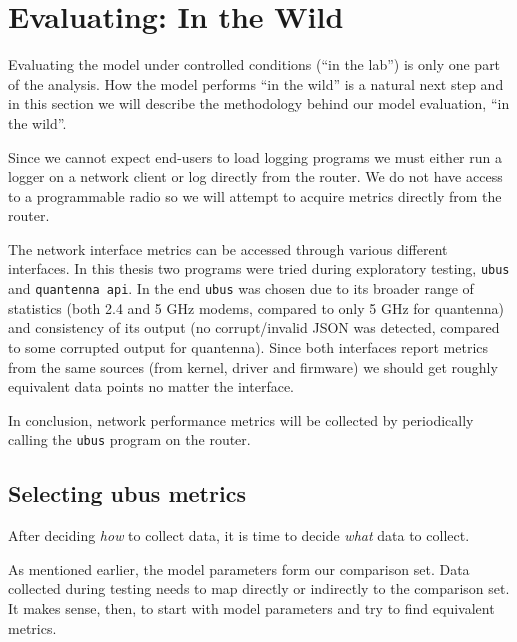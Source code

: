 \section{Evaluating: In the Wild}

Evaluating the model under controlled conditions (``in the lab'') is only one
part of the analysis. How the model performs ``in the wild'' is a natural next
step and in this section we will describe the methodology behind our model
evaluation, ``in the wild''.

Since we cannot expect end-users to load logging programs we must either run a
logger on a network client or log directly from the router. We do not have
access to a programmable radio so we will attempt to acquire metrics directly
from the router.

The network interface metrics can be accessed through various different
interfaces. In this thesis two programs were tried during exploratory testing,
\texttt{ubus} and \texttt{quantenna api}. In the end \texttt{ubus} was chosen
due to its broader range of statistics (both 2.4 and 5 GHz modems, compared to
only 5 GHz for quantenna) and consistency of its output (no corrupt/invalid
JSON was detected, compared to some corrupted output for quantenna). Since
both interfaces report metrics from the same sources (from kernel, driver and
firmware) we should get roughly equivalent data points no matter the
interface.

In conclusion, network performance metrics will be collected by periodically
calling the \texttt{ubus} program on the router.

\subsection{Selecting ubus metrics}

After deciding \emph{how} to collect data, it is time to decide \emph{what}
data to collect.

As mentioned earlier, the model parameters form our comparison set. Data
collected during testing needs to map directly or indirectly to the comparison
set. It makes sense, then, to start with model parameters and try to find
equivalent metrics.

